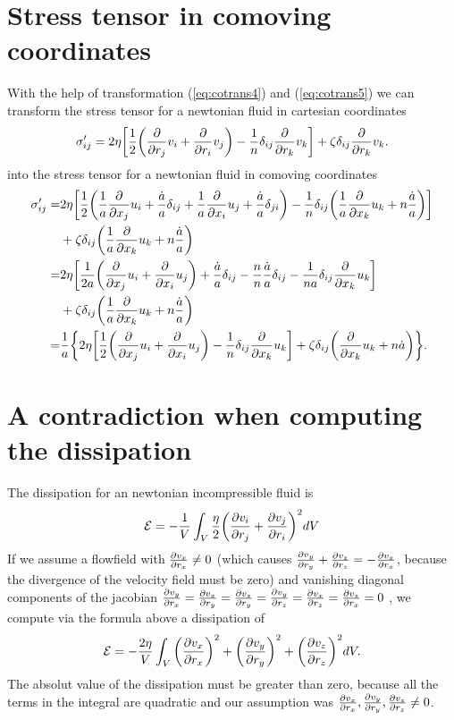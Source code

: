 \section{Stress tensor in comoving coordinates}\label{costress}
With the help of transformation (\ref{eq:cotrans4}) and (\ref{eq:cotrans5}) we
can transform the stress tensor for a newtonian fluid in cartesian coordinates
\begin{align}
\sigma'_{ij}= 2\eta\lrb{\frac{1}{2}\lra{\pd{r_j}v_i+\pd{r_i}v_j}
-\frac{1}{n}\delta_{ij}\pd{r_k}v_k}+\zeta\delta_{ij}\pd{r_k}v_k.
\end{align}
into the stress tensor for a newtonian fluid in comoving coordinates
\begin{align}
\sigma'_{ij}=& 
2\eta\lrb{\frac{1}{2} 
\lra{\fa\pd{x_j}u_i+\fh\delta_{ij}+\fa\pd{x_i}u_j+\fh\delta_{ji}} 
-\frac{1}{n}\delta_{ij}\lra{\fa\pd{x_k}u_k+n\fh}}\\
&+\zeta\delta_{ij}\lra{\fa\pd{x_k}u_k+n\fh}\\
=&2\eta\lrb{\frac{1}{2 a} 
\lra{\pd{x_j}u_i+\pd{x_i}u_j}+\fh\delta_{ij}-\frac{n}{n}\fh\delta_{ij}
-\frac{1}{n a}\delta_{ij}\pd{x_k}u_k}\\
&+\zeta\delta_{ij}\lra{\fa\pd{x_k}u_k+n\fh}\\
=&\fa\lrc{2\eta\lrb{\frac{1}{2} 
\lra{\pd{x_j}u_i+\pd{x_i}u_j}-\frac{1}{n}\delta_{ij}\pd{x_k}u_k}
+\zeta\delta_{ij}\lra{\pd{x_k}u_k+n\dot{a}}}.
\end{align}

\section{A contradiction when computing the dissipation}\label{contradiss}
The dissipation for an newtonian incompressible fluid is
\begin{align}
\mathcal{E}
=-\frac{1}{V} \int_V \frac{\eta}{2}\lra{\ppd{r_j}{v_i}+\ppd{r_i}{v_j}}^2 dV
\end{align}
If we assume a flowfield with $\ppd{r_x}{v_x} \neq 0$ (which causes
$\ppd{r_y}{v_y}+\ppd{r_z}{v_z}=-\ppd{r_x}{v_x}$, because the divergence
of the velocity field must be zero) and vanishing diagonal components of
the jacobian 
$\ppd{r_x}{v_y}=\ppd{r_y}{v_x}=\ppd{r_y}{v_z}=\ppd{r_z}{v_y}=\ppd{r_z}{v_x}=\ppd{r_x}{v_z}=0$
, we compute via the formula above a
dissipation of
\begin{align}
\mathcal{E}
=-\frac{2 \eta}{V} \int_V \lra{\ppd{r_x}{v_x}}^2 +\lra{\ppd{r_y}{v_y}}^2 +
\lra{\ppd{r_z}{v_z}}^2 dV. 
\end{align}
The absolut value of the dissipation must be greater than zero, because 
all the terms in the integral are quadratic and our assumption was
$\ppd{r_x}{v_x},\ppd{r_y}{v_y},\ppd{r_z}{v_z}  \neq 0$. 

